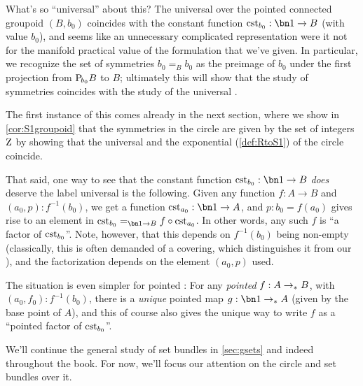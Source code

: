 \begin{remark}
  What's so ``universal'' about this?
The universal \covering over the pointed connected groupoid $(B,b_0)$ coincides with the constant function $\cst{b_0}:\bn 1\to B$ (with value $b_0$), and seems like an unnecessary complicated representation were it not for the manifold practical value of the formulation that we've given.
In particular, we recognize the set of symmetries $b_0=_Bb_0$ as the preimage of $b_0$ under the first projection from ${\mathrm{P}_{\!b_0}}B$ to $B$; ultimately this will show that the study of symmetries coincides with the study of the universal \covering.

The first instance of this comes already in the next section, where we show in \cref{cor:S1groupoid} that the symmetries in the circle are given by the set of integers $\mathrm{Z}$ by showing that the universal \covering and the exponential \covering (\cref{def:RtoS1}) of the circle coincide.

That said, one way to see that the constant function $\cst{b_0}:\bn 1\to B$
\emph{does} deserve the label universal is the following.
Given any function $f:A\to B$ and $(a_0,p): f^{-1}(b_0)$,
we get a function $\cst{a_0}:\bn 1\to A$, and $p:b_0=f(a_0)$ gives rise to
an element in $\cst{b_0}=_{\bn 1\to B}f \circ \cst{a_0}$.
In other words, any such $f$ is ``a factor of $\cst{b_0}$''.
Note, however, that this depends on $f^{-1}(b_0)$ being non-empty
(classically, this is often demanded of a covering, which distinguishes it from our \coverings),
and the factorization depends on the element $(a_0,p)$ used.

The situation is even simpler for pointed \coverings:
For any \emph{pointed} \covering $f : A \to_\ast B$, with $(a_0,f_0):f^{-1}(b_0)$,
there is a \emph{unique} pointed map $g : \bn 1 \ptdto A$
(given by the base point of $A$), and this of course also gives
the unique way to write $f$ as a ``pointed factor of $\cst{b_0}$''.
\end{remark}

We'll continue the general study of set bundles in \cref{sec:gsets}
and indeed throughout the book.
For now, we'll focus our attention on the circle and set bundles over it.

